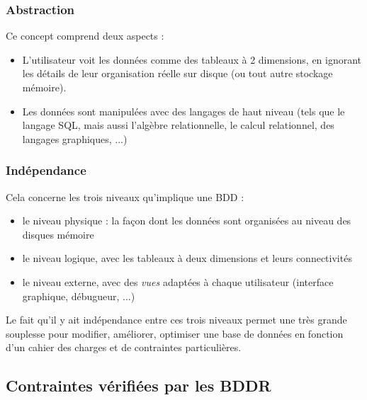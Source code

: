 \documentclass[french,11pt,twoside]{VcCours}
\begin{document}
\subsubsection{Abstraction}

Ce concept comprend deux aspects :
\begin{itemize}
 \item L'utilisateur voit les données comme des tableaux à 2 dimensions, en ignorant les détails de leur organisation réelle sur disque (ou tout autre stockage mémoire).
 \item Les données sont manipulées avec des langages de haut niveau (tels que le langage SQL, mais aussi l'algèbre relationnelle, le calcul relationnel, des langages graphiques, ...)
\end{itemize}


\subsubsection{Indépendance}

Cela concerne les trois niveaux qu'implique une BDD : 
\begin{itemize}
 \item le niveau physique : la façon dont les données sont organisées au niveau des disques mémoire
 \item le niveau logique, avec les tableaux à deux dimensions et leurs connectivités
 \item le niveau externe, avec des \emph{vues} adaptées à chaque utilisateur (interface graphique, débugueur, ...)
\end{itemize}
Le fait qu'il y ait indépendance entre ces trois niveaux permet une très grande souplesse pour modifier, améliorer, optimiser une base de données en fonction d'un cahier des charges et de contraintes particulières.

\subsection{Contraintes vérifiées par les BDDR}
\end{document}
